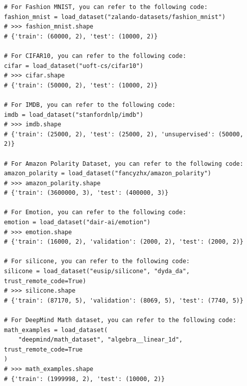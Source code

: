 \begin{appendices}
\begin{tcolorbox}[breakable, colback=orange!5!white, colframe=orange!80!black, title=The dataset reference prompt for generalized dataset access]
\begin{Verbatim}[breaklines, breaksymbol={}, breaksymbolleft={}, fontsize=\small]
# For Fashion MNIST, you can refer to the following code:
fashion_mnist = load_dataset("zalando-datasets/fashion_mnist")
# >>> fashion_mnist.shape
# {'train': (60000, 2), 'test': (10000, 2)}

# For CIFAR10, you can refer to the following code:
cifar = load_dataset("uoft-cs/cifar10")
# >>> cifar.shape
# {'train': (50000, 2), 'test': (10000, 2)}

# For IMDB, you can refer to the following code:
imdb = load_dataset("stanfordnlp/imdb")
# >>> imdb.shape
# {'train': (25000, 2), 'test': (25000, 2), 'unsupervised': (50000, 2)}

# For Amazon Polarity Dataset, you can refer to the following code:
amazon_polarity = load_dataset("fancyzhx/amazon_polarity")
# >>> amazon_polarity.shape
# {'train': (3600000, 3), 'test': (400000, 3)}

# For Emotion, you can refer to the following code:
emotion = load_dataset("dair-ai/emotion")
# >>> emotion.shape
# {'train': (16000, 2), 'validation': (2000, 2), 'test': (2000, 2)}

# For silicone, you can refer to the following code:
silicone = load_dataset("eusip/silicone", "dyda_da", trust_remote_code=True)
# >>> silicone.shape
# {'train': (87170, 5), 'validation': (8069, 5), 'test': (7740, 5)}

# For DeepMind Math dataset, you can refer to the following code:
math_examples = load_dataset(
    "deepmind/math_dataset", "algebra__linear_1d", trust_remote_code=True
)
# >>> math_examples.shape
# {'train': (1999998, 2), 'test': (10000, 2)}
\end{Verbatim}
\end{tcolorbox}


\end{appendices}
